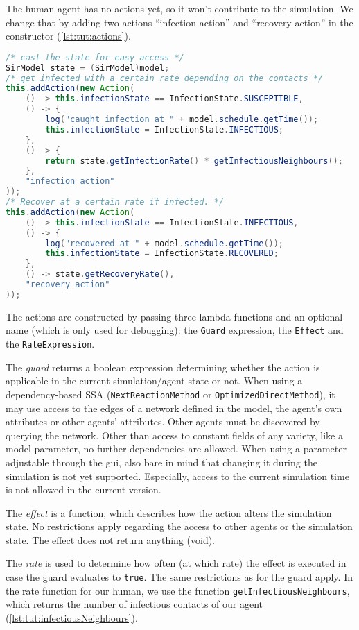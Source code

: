\documentclass[a4paper, 12pt, bibliography=numbered]{article}
\begin{document}
The human agent has no actions yet, so it won't contribute to the simulation. We change that by adding two actions ``infection action'' and ``recovery action'' in the constructor (\autoref{lst:tut:actions}).

\begin{lstlisting}[label=lst:tut:actions,caption={The actions of our Human agent.},language=Java]
/* cast the state for easy access */
SirModel state = (SirModel)model;
/* get infected with a certain rate depending on the contacts */
this.addAction(new Action(
    () -> this.infectionState == InfectionState.SUSCEPTIBLE,
    () -> {
        log("caught infection at " + model.schedule.getTime());
        this.infectionState = InfectionState.INFECTIOUS;
    },
    () -> {
        return state.getInfectionRate() * getInfectiousNeighbours();
    },
    "infection action"
));
/* Recover at a certain rate if infected. */
this.addAction(new Action(
    () -> this.infectionState == InfectionState.INFECTIOUS,
    () -> {
        log("recovered at " + model.schedule.getTime());
        this.infectionState = InfectionState.RECOVERED;
    },
    () -> state.getRecoveryRate(),
    "recovery action"
));
\end{lstlisting}

The actions are constructed by passing three lambda functions and an optional name (which is only used for debugging): the \texttt{Guard} expression, the \texttt{Effect} and the \texttt{RateExpression}.

The \textit{guard} returns a boolean expression determining whether the action is applicable in the current simulation/agent state or not. When using a dependency-based SSA (\texttt{NextReactionMethod} or \texttt{OptimizedDirectMethod}), it may use access to the edges of a network defined in the model, the agent's own attributes or other agents' attributes. Other agents must be discovered by querying the network. Other than access to constant fields of any variety, like a model parameter, no further dependencies are allowed. When using a parameter adjustable through the gui, also bare in mind that changing it during the simulation is not yet supported. Especially, access to the current simulation time is not allowed in the current version.

The \textit{effect} is a function, which describes how the action alters the simulation state. No restrictions apply regarding the access to other agents or the simulation state. The effect does not return anything (void).

The \textit{rate} is used to determine how often (at which rate) the effect is executed in case the guard evaluates to \texttt{true}. The same restrictions as for the guard apply. In the rate function for our human, we use the function \texttt{getInfectiousNeighbours}, which returns the number of infectious contacts of our agent (\autoref{lst:tut:infectiousNeighbours}).
\end{document}
